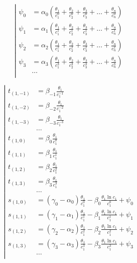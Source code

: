 \begin{equation*} \left| \begin{aligned}
\psi_0 &= \alpha_0 \left(
  \frac{\theta_1}{c_1^0}
+ \frac{\theta_2}{c_2^0}
+ \frac{\theta_3}{c_3^0}
+ \ldots
+ \frac{\theta_n}{c_n^0} \right) \\
%
\psi_1 &= \alpha_1 \left(
  \frac{\theta_1}{c_1^1}
+ \frac{\theta_2}{c_2^1}
+ \frac{\theta_3}{c_3^1}
+ \ldots
+ \frac{\theta_n}{c_n^1} \right) \\
%
\psi_2 &= \alpha_2 \left(
  \frac{\theta_1}{c_1^2}
+ \frac{\theta_2}{c_2^2}
+ \frac{\theta_3}{c_3^2}
+ \ldots
+ \frac{\theta_n}{c_n^2} \right) \\
%
\psi_3 &= \alpha_3 \left(
  \frac{\theta_1}{c_1^3}
+ \frac{\theta_2}{c_2^3}
+ \frac{\theta_3}{c_3^3}
+ \ldots
+ \frac{\theta_n}{c_n^3} \right) \\
%
&\ldots \\
\end{aligned} \right. \end{equation*}

\begin{equation*} \left| \begin{aligned}
t_{(1,-1)} &=
  \beta_{-1} \frac{\theta_1}{c_1^{-1}} \\
%
t_{(1,-2)} &=
  \beta_{-2} \frac{\theta_1}{c_1^{-2}} \\
%
t_{(1,-3)} &=
  \beta_{-3} \frac{\theta_1}{c_1^{-3}} \\
%
&\ldots \\
%
t_{(1,0)} &=
  \beta_0 \frac{\theta_1}{c_1^0} \\
%
t_{(1,1)} &=
  \beta_1 \frac{\theta_1}{c_1^1} \\
%
t_{(1,2)} &=
  \beta_2 \frac{\theta_1}{c_1^2} \\
%
t_{(1,3)} &=
  \beta_3 \frac{\theta_1}{c_1^3} \\
%
&\ldots \\
%
s_{(1,0)} &=
  (\gamma_0 - \alpha_0) \frac{\theta_1}{c_1^0}
- \beta_0 \frac{\theta_1 \ln{c_1}}{c_1^0}
+ \psi_0 \\
%
s_{(1,1)} &=
  (\gamma_1 - \alpha_1) \frac{\theta_1}{c_1^1}
- \beta_1 \frac{\theta_1 \ln{c_1}}{c_1^1}
+ \psi_1 \\
%
s_{(1,2)} &=
  (\gamma_2 - \alpha_2) \frac{\theta_1}{c_1^2}
- \beta_2 \frac{\theta_1 \ln{c_1}}{c_1^2}
+ \psi_2 \\
%
s_{(1,3)} &=
  (\gamma_3 - \alpha_3) \frac{\theta_1}{c_1^3}
- \beta_3 \frac{\theta_1 \ln{c_1}}{c_1^3}
+ \psi_3 \\
%
&\ldots \\
\end{aligned} \right. \end{equation*}

